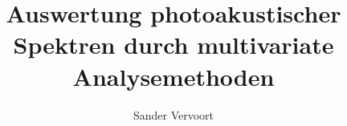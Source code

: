 \documentclass[a4paper, 12pt, BCOR=1cm, ngerman, numbers=noenddot]{scrbook}
\begin{document}
\author{Sander Vervoort}
\title{Auswertung photoakustischer Spektren durch multivariate Analysemethoden}

\begin{titlepage}
  
\end{titlepage}

\begin{otherlanguage}{ngerman}
  
\end{otherlanguage}


\begin{otherlanguage}{english}
  
\end{otherlanguage}

{\hypersetup{hidelinks}\tableofcontents} %
%

\clearpage %


% 
% 
% 
% 
% 
% 

\clearpage %
\clearpage{\thispagestyle{empty}\cleardoublepage}
\appendix 								%
\printbibliography
{} %

\glsfindwidesttoplevelname
{}
\printnoidxglossaries



\end{document}
